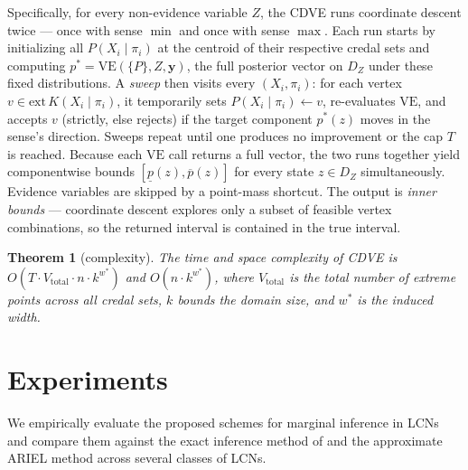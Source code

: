 \documentclass{article}
\newtheorem{theorem}{Theorem}
\begin{document}
Specifically, for every non-evidence variable $Z$, the CDVE runs coordinate descent twice --- once with sense $\min$ and once with sense $\max$. Each run starts by initializing all $P(X_i \mid \pi_i)$ at the centroid of their respective credal sets and computing $p^* = \mathrm{VE}(\{P\}, Z, \mathbf{y})$, the full posterior vector on $D_Z$ under these fixed distributions. A \emph{sweep} then visits every $(X_i, \pi_i)$: for each vertex $v \in \mathrm{ext}\,K(X_i \mid \pi_i)$, it temporarily sets $P(X_i \mid \pi_i) \gets v$, re-evaluates $\mathrm{VE}$, and accepts $v$ (strictly, else rejects) if the target component $p^*(z)$ moves in the sense's direction. Sweeps repeat until one produces no improvement or the cap $T$ is reached. Because
each $\mathrm{VE}$ call returns a full vector, the two runs together yield componentwise bounds $[\underline{p}(z), \overline{p}(z)]$ for every state $z \in D_Z$ simultaneously. Evidence variables are skipped by a point-mass shortcut. The output is \emph{inner bounds} --- coordinate descent explores only a subset of feasible vertex combinations, so the returned interval is
contained in the true interval. 

\begin{theorem}[complexity]
    The time and space complexity of CDVE is $O(T \cdot V_{\text{total}} \cdot n \cdot k^{w^*})$ and $O(n\cdot k^{w^*})$, where $V_{\text{total}}$ is the total number of extreme points across all credal sets, $k$ bounds the domain size, and $w^*$ is the induced width.    
\end{theorem}

\section{Experiments}
\label{sec-experiments}

We empirically evaluate the proposed schemes for marginal inference in LCNs and compare them against the exact inference method of \cite{marinescu2022neurips} and the approximate ARIEL method \cite{marinescu2023lcn} across several classes of LCNs.
\end{document}
